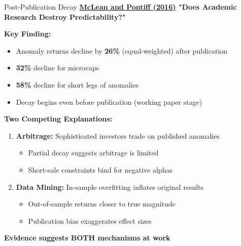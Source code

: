 \documentclass{beamer}
\begin{document}
\begin{frame}{Post-Publication Decay}
    \textbf{\textcolor{blue}{\href{https://doi.org/10.1093/rfs/hhw101}{McLean and Pontiff (2016)}} "Does Academic Research Destroy Predictability?"}
    
    
    \textbf{Key Finding:}
    \begin{itemize}
        \item Anomaly returns decline by \textbf{26\%} (equal-weighted) after publication
        \item \textbf{32\%} decline for microcaps
        \item \textbf{58\%} decline for short legs of anomalies
        \item Decay begins even before publication (working paper stage)
    \end{itemize}
    
    
    \textbf{Two Competing Explanations:}
    \begin{enumerate}
        \item \textbf{Arbitrage:} Sophisticated investors trade on published anomalies
        \begin{itemize}
            \item Partial decay suggests arbitrage is limited
            \item Short-sale constraints bind for negative alphas
        \end{itemize}
        
        \item \textbf{Data Mining:} In-sample overfitting inflates original results
        \begin{itemize}
            \item Out-of-sample returns closer to true magnitude
            \item Publication bias exaggerates effect sizes
        \end{itemize}
    \end{enumerate}
    
    
    \textbf{Evidence suggests BOTH mechanisms at work}
\end{frame}
\end{document}
